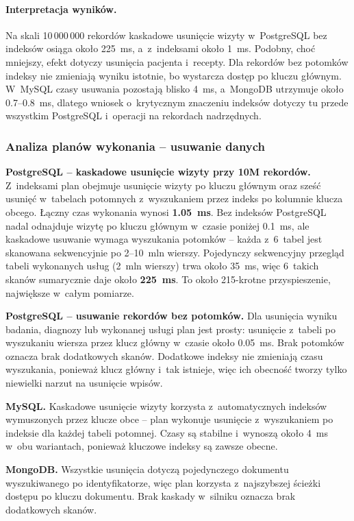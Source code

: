 \documentclass[12pt,a4paper]{article}
\begin{document}
\paragraph{Interpretacja wyników.}
Na skali 10\,000\,000 rekordów kaskadowe usunięcie wizyty w~PostgreSQL bez indeksów osiąga około 225~ms, a~z~indeksami około 1~ms. Podobny, choć mniejszy, efekt dotyczy usunięcia pacjenta i~recepty. Dla rekordów bez potomków indeksy nie zmieniają wyniku istotnie, bo wystarcza dostęp po kluczu głównym. W~MySQL czasy usuwania pozostają blisko 4~ms, a~MongoDB utrzymuje około 0.7--0.8~ms, dlatego wniosek o~krytycznym znaczeniu indeksów dotyczy tu przede wszystkim PostgreSQL i~operacji na rekordach nadrzędnych.

\subsubsection*{Analiza planów wykonania -- usuwanie danych}

\textbf{PostgreSQL -- kaskadowe usunięcie wizyty przy 10M rekordów.} Z~indeksami plan obejmuje usunięcie wizyty po kluczu głównym oraz sześć usunięć w~tabelach potomnych z~wyszukaniem przez indeks po kolumnie klucza obcego. Łączny czas wykonania wynosi \textbf{1.05~ms}. Bez indeksów PostgreSQL nadal odnajduje wizytę po kluczu głównym w~czasie poniżej 0.1~ms, ale kaskadowe usuwanie wymaga wyszukania potomków -- każda z~6~tabel jest skanowana sekwencyjnie po 2--10~mln wierszy. Pojedynczy sekwencyjny przegląd tabeli wykonanych usług (2~mln wierszy) trwa około 35~ms, więc 6~takich skanów sumarycznie daje około \textbf{225~ms}. To około 215-krotne przyspieszenie, największe w~całym pomiarze.

\textbf{PostgreSQL -- usuwanie rekordów bez potomków.} Dla usunięcia wyniku badania, diagnozy lub wykonanej usługi plan jest prosty: usunięcie z~tabeli po wyszukaniu wiersza przez klucz główny w~czasie około 0.05~ms. Brak potomków oznacza brak dodatkowych skanów. Dodatkowe indeksy nie zmieniają czasu wyszukania, ponieważ klucz główny i~tak istnieje, więc ich obecność tworzy tylko niewielki narzut na usunięcie wpisów.

\textbf{MySQL.} Kaskadowe usunięcie wizyty korzysta z~automatycznych indeksów wymuszonych przez klucze obce -- plan wykonuje usunięcie z~wyszukaniem po indeksie dla każdej tabeli potomnej. Czasy są stabilne i~wynoszą około 4~ms w~obu wariantach, ponieważ kluczowe indeksy są zawsze obecne.

\textbf{MongoDB.} Wszystkie usunięcia dotyczą pojedynczego dokumentu wyszukiwanego po identyfikatorze, więc plan korzysta z~najszybszej ścieżki dostępu po kluczu dokumentu. Brak kaskady w~silniku oznacza brak dodatkowych skanów.
\end{document}
